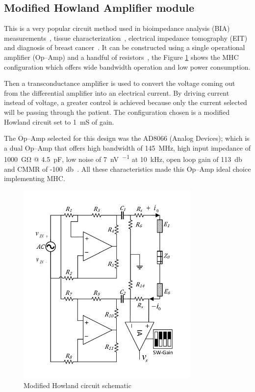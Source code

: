 \subsection{Modified Howland Amplifier module}
\label{section MHC}
This is a very popular circuit method used in bioimpedance analysis (BIA) measurements~\cite{aroom2009bioimpedance}, tissue characterization~\cite{bertemes2002tissue,ross2003current}, electrical impedance tomography (EIT) and diagnosis of breast cancer~\cite{zou2003review,saulnier2007electrical}. It can be constructed using a single operational amplifier (Op–Amp) and a handful of resistors~\cite{sheingold1964impedance}, the Figure \ref{fig:mhc} shows the MHC configuration which offers wide bandwidth operation and low power consumption. 

Then a transconductance amplifier is used to convert the voltage coming out from the differential amplifier into an electrical current. By driving current instead of voltage, a greater control is achieved because only the current selected will be passing through the patient. The configuration chosen is a modified Howland circuit set to \SI{1}{\milli\siemens} of gain.

The Op–Amp selected for this design was the AD8066 (Analog Devices); which is a dual Op–Amp that offers high bandwidth of \SI{145}{\mega\hertz}, high input impedance of \SI{1000}{\giga\ohm} @ \SI{4.5}{\pF}, low noise of \SI{7}{\nano\volt\per{}} at \SI{10}{\kilo\hertz}, open loop gain of \SI{113}{\decibel} and CMMR of -\SI{100}{\decibel}~\cite{ad:AD8066}. All these characteristics made this Op–Amp ideal choice implementing MHC.

\begin{figure}[!htpb]
	\centering
	\includegraphics[width=9cm,keepaspectratio]{figure3}  
    \caption{Modified Howland circuit schematic}
    \label{fig:mhc}
\end{figure}

